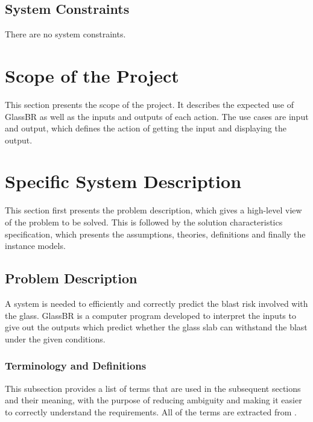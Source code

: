 \documentclass[12pt]{article}
\newcommand{\progname}{GlassBR}
\begin{document}
\subsection{System Constraints}

There are no system constraints.

\section{Scope of the Project} 

This section presents the scope of the project. It describes the expected use of
\progname{} as well as the inputs and outputs of each action.  The use cases are
input and output, which defines the action of getting the input and displaying
the output.


\section{Specific System Description}

This section first presents the problem description, which gives a high-level
view of the problem to be solved.  This is followed by the solution characteristics
specification, which presents the assumptions, theories, definitions and finally
the instance models. 

\subsection{Problem Description}\label{Sec_pd}

A system is needed to efficiently and correctly predict the blast risk involved
with the glass. \progname{} is a computer program developed to interpret the
inputs to give out the outputs which predict whether the glass slab can
withstand the blast under the given conditions.

\subsubsection{Terminology and  Definitions}

This subsection provides a list of terms that are used in the subsequent
sections and their meaning, with the purpose of reducing ambiguity and making it
easier to correctly understand the requirements.  All of the terms are extracted
from \cite{ASTM2009}.
\end{document}
